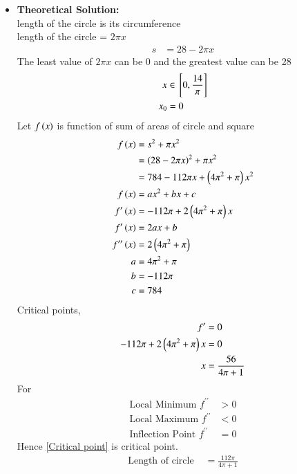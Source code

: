\documentclass[journal]{IEEEtran}
\numberwithin{equation}{enumi}
\numberwithin{figure}{enumi}
\begin{document}
\begin{itemize}
    \item \textbf{Theoretical Solution:}\\
    length of the circle is its circumference\\
    length of the circle = $2\pi x$
    \begin{align}
        s &= 28 - 2\pi x
    \end{align}
    The least value of $2\pi x$ can be 0 and the greatest value can be 28
    \begin{align}
        x &\in {}\left[0, \frac{14}{\pi}\right]\\
        x_0 &= 0
    \end{align}
    Let $f\left(x\right)$ is function of sum of areas of circle and square
    \begin{align}
        f\left(x\right) &= s^2 + \pi x^2\\
         &= \left(28 - 2\pi x\right)^2 + \pi x^2\\
         &= 784 - 112\pi x + \left(4\pi^2 + \pi\right)x^2\\
        f\left(x\right) &= ax^2 + bx + c \\
        f^{\prime}\left(x\right) &= -112\pi + 2\left(4\pi^2 + \pi\right)x\\
        f^{\prime}\left(x\right) &= 2ax + b\\
        f^{\prime\prime}\left(x\right) &= 2\left(4\pi^2 + \pi\right)\\
        a &= 4\pi^2 + \pi\\
        b &= -112\pi\\
        c &= 784
    \end{align}
    Critical points, 
    \begin{align}
        f^{\prime} &= 0\\
        -112\pi + 2\left(4\pi^2 + \pi\right)x &= 0\\
        x &= \frac{56}{4\pi + 1} \label{Critical point}
    \end{align}
    For
    \begin{align}
        \text{Local Minimum } f^{\prime\prime} &> 0\\
        \text{Local Maximum } f^{\prime\prime} &< 0\\
        \text{Inflection Point } f^{\prime\prime} &= 0
    \end{align}
    Hence \eqref{Critical point} is critical point.
    \begin{align}
        \text{Length of circle } &= \frac{112\pi}{4\pi + 1}\\

\end{align}
\end{itemize}
\end{document}
